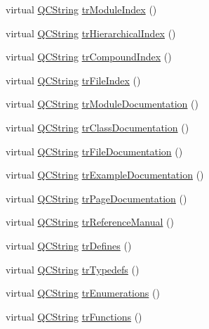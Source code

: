 \begin{DoxyCompactItemize}
\item 
virtual \hyperlink{class_q_c_string}{Q\+C\+String} \hyperlink{class_translator_serbian_aa78f2a7500c7a180b7045e62f89150fa}{tr\+Module\+Index} ()
\item 
virtual \hyperlink{class_q_c_string}{Q\+C\+String} \hyperlink{class_translator_serbian_ac6c2e6d4c229ac61fd4b6db3da88ad24}{tr\+Hierarchical\+Index} ()
\item 
virtual \hyperlink{class_q_c_string}{Q\+C\+String} \hyperlink{class_translator_serbian_a8ecd3c5dc710bc06af57bbeb51eb4dd6}{tr\+Compound\+Index} ()
\item 
virtual \hyperlink{class_q_c_string}{Q\+C\+String} \hyperlink{class_translator_serbian_a4d3964712614072f853e0971baf9ee1e}{tr\+File\+Index} ()
\item 
virtual \hyperlink{class_q_c_string}{Q\+C\+String} \hyperlink{class_translator_serbian_aceee39bcbfce870563028d9ccc58fc29}{tr\+Module\+Documentation} ()
\item 
virtual \hyperlink{class_q_c_string}{Q\+C\+String} \hyperlink{class_translator_serbian_aa47e77c7d05c0a5d2113185f17804fe7}{tr\+Class\+Documentation} ()
\item 
virtual \hyperlink{class_q_c_string}{Q\+C\+String} \hyperlink{class_translator_serbian_a0879462f1955e136115808a1f0531056}{tr\+File\+Documentation} ()
\item 
virtual \hyperlink{class_q_c_string}{Q\+C\+String} \hyperlink{class_translator_serbian_abacc757e76d020434c2c23c6ac07fbb9}{tr\+Example\+Documentation} ()
\item 
virtual \hyperlink{class_q_c_string}{Q\+C\+String} \hyperlink{class_translator_serbian_a9557c10058b784c24feb7b78b3807025}{tr\+Page\+Documentation} ()
\item 
virtual \hyperlink{class_q_c_string}{Q\+C\+String} \hyperlink{class_translator_serbian_aacc7c3b3d457598eb983e27adb2dcd2e}{tr\+Reference\+Manual} ()
\item 
virtual \hyperlink{class_q_c_string}{Q\+C\+String} \hyperlink{class_translator_serbian_a0224a435655cfdcd99f28859036d2f6b}{tr\+Defines} ()
\item 
virtual \hyperlink{class_q_c_string}{Q\+C\+String} \hyperlink{class_translator_serbian_aa586d76a9fac0d8e35a6dcddd3b24ede}{tr\+Typedefs} ()
\item 
virtual \hyperlink{class_q_c_string}{Q\+C\+String} \hyperlink{class_translator_serbian_a1ea8330a78408817fe7deb5b8306b4c4}{tr\+Enumerations} ()
\item 
virtual \hyperlink{class_q_c_string}{Q\+C\+String} \hyperlink{class_translator_serbian_a5590b5948702e405487a7e396fea374e}{tr\+Functions} ()

\end{DoxyCompactItemize}
